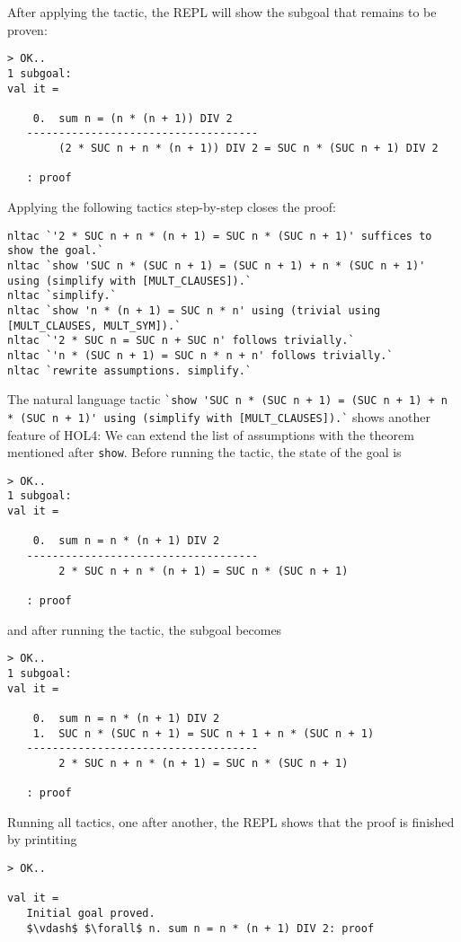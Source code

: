 After applying the tactic, the REPL will show the subgoal that remains to be proven:
\begin{lstlisting}
> OK..
1 subgoal:
val it =

    0.  sum n = (n * (n + 1)) DIV 2
   ------------------------------------
        (2 * SUC n + n * (n + 1)) DIV 2 = SUC n * (SUC n + 1) DIV 2

   : proof
\end{lstlisting}

Applying the following tactics step-by-step closes the proof:

\begin{lstlisting}
nltac `'2 * SUC n + n * (n + 1) = SUC n * (SUC n + 1)' suffices to show the goal.`
nltac `show 'SUC n * (SUC n + 1) = (SUC n + 1) + n * (SUC n + 1)' using (simplify with [MULT_CLAUSES]).`
nltac `simplify.`
nltac `show 'n * (n + 1) = SUC n * n' using (trivial using [MULT_CLAUSES, MULT_SYM]).`
nltac `'2 * SUC n = SUC n + SUC n' follows trivially.`
nltac `'n * (SUC n + 1) = SUC n * n + n' follows trivially.`
nltac `rewrite assumptions. simplify.`
\end{lstlisting}

\begin{sloppypar}
The natural language tactic \lstinline{`show 'SUC n * (SUC n + 1) = (SUC n + 1) + n * (SUC n + 1)' using (simplify with [MULT_CLAUSES]).`}
shows another feature of HOL4:
We can extend the list of assumptions with the theorem mentioned after
\lstinline{show}.
Before running the tactic, the state of the goal is
\end{sloppypar}
\begin{lstlisting}
> OK..
1 subgoal:
val it =

    0.  sum n = n * (n + 1) DIV 2
   ------------------------------------
        2 * SUC n + n * (n + 1) = SUC n * (SUC n + 1)

   : proof
\end{lstlisting}

and after running the tactic, the subgoal becomes
\begin{lstlisting}
> OK..
1 subgoal:
val it =

    0.  sum n = n * (n + 1) DIV 2
    1.  SUC n * (SUC n + 1) = SUC n + 1 + n * (SUC n + 1)
   ------------------------------------
        2 * SUC n + n * (n + 1) = SUC n * (SUC n + 1)

   : proof
\end{lstlisting}

Running all tactics, one after another, the REPL shows that the proof is finished by printiting
\begin{lstlisting}
> OK..

val it =
   Initial goal proved.
   $\vdash$ $\forall$ n. sum n = n * (n + 1) DIV 2: proof
\end{lstlisting}


